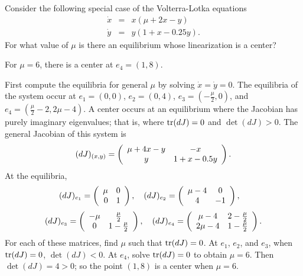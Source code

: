 \documentclass{ximera}
\begin{document}
\begin{exercise} \label{c9.1.2}
Consider the following special case of the Volterra-Lotka equations 
\begin{eqnarray*}
\dot{x} & = & x(\mu + 2x -     y)  \\
\dot{y} & = & y(  1 +  x - 0.25y).
\end{eqnarray*}
For what value of $\mu$ is there an equilibrium whose linearization is a 
center?   

\begin{solution}

\ans For $\mu = 6$, there is a center at $e_4 = (1,8)$.

\soln First compute the equilibria for general $\mu$ by solving
$\dot{x} = \dot{y} = 0$.  The equilibria of the system occur at
$e_1 = (0,0)$, $e_2 = (0,4)$, $e_3 = (-\frac{\mu}{2},0)$, and
$e_4 = (\frac{\mu}{2} - 2, 2\mu - 4)$.  A center occurs at an equilibrium
where the Jacobian has purely imaginary eigenvalues; that is, where
${\rm tr}{(dJ)} = 0$ and $\det{(dJ)} > 0$.  The general Jacobian of this
system is
\[
(dJ)_{(x,y)} = \left(\begin{array}{cc} \mu + 4x - y & -x\\ y &1 + x - 0.5y\end{array}\right).
\]
At the equilibria,
\[
(dJ)_{e_1} = \left(\begin{array}{rr} \mu & 0\\ 0 &1\end{array}\right), \quad
(dJ)_{e_2} = \left(\begin{array}{cc} \mu - 4 & 0\\ 4 &-1\end{array}\right), \quad
\]
\[
(dJ)_{e_3} = \left(\begin{array}{cc} -\mu & \frac{\mu}{2}\\ 0 &1 - \frac{\mu}{2}\end{array}\right), \quad
(dJ)_{e_4} = \left(\begin{array}{cc} \mu - 4 & 2 - \frac{\mu}{2}\\ 2\mu - 4 &1 -
\frac{\mu}{2}\end{array}\right).
\]
For each of these matrices, find $\mu$ such that ${\rm tr}{(dJ)} = 0$.  At
$e_1$, $e_2$, and $e_3$, when ${\rm tr}{(dJ)} = 0$, $\det{(dJ)} < 0$.
At $e_4$, solve ${\rm tr}(dJ) = 0$ to obtain $\mu = 6$.  Then $\det{(dJ)}
= 4 > 0$; so the point $(1,8)$ is a center when $\mu = 6$.

\end{solution}
\end{exercise}
\end{document}
